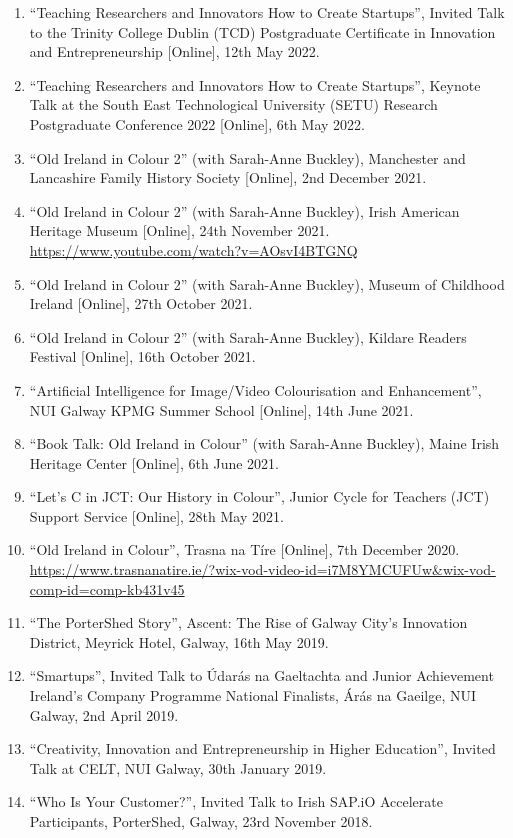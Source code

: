 \documentclass[10pt,a4paper]{res} %
\begin{document}
\begin{resume}
\begin{enumerate}
\item ``Teaching Researchers and Innovators How to Create Startups'', Invited Talk to the Trinity College Dublin (TCD) Postgraduate Certificate in Innovation and Entrepreneurship [Online], 12th May 2022.
\item ``Teaching Researchers and Innovators How to Create Startups'', Keynote Talk at the South East Technological University (SETU) Research Postgraduate Conference 2022 [Online], 6th May 2022.
\item ``Old Ireland in Colour 2'' (with Sarah-Anne Buckley), Manchester and Lancashire Family History Society [Online], 2nd December 2021.
\item ``Old Ireland in Colour 2'' (with Sarah-Anne Buckley), Irish American Heritage Museum [Online], 24th November 2021. \url{https://www.youtube.com/watch?v=AOsvI4BTGNQ}
\item ``Old Ireland in Colour 2'' (with Sarah-Anne Buckley), Museum of Childhood Ireland [Online], 27th October 2021.
\item ``Old Ireland in Colour 2'' (with Sarah-Anne Buckley), Kildare Readers Festival [Online], 16th October 2021.
\item ``Artificial Intelligence for Image/Video Colourisation and Enhancement'', NUI Galway KPMG Summer School [Online], 14th June 2021.
\item ``Book Talk: Old Ireland in Colour'' (with Sarah-Anne Buckley), Maine Irish Heritage Center [Online], 6th June 2021.
\item ``Let's C in JCT: Our History in Colour'', Junior Cycle for Teachers (JCT) Support Service [Online], 28th May 2021.
\item ``Old Ireland in Colour'', Trasna na T\'{i}re [Online], 7th December 2020. \url{https://www.trasnanatire.ie/?wix-vod-video-id=i7M8YMCUFUw&wix-vod-comp-id=comp-kb431v45}
\item ``The PorterShed Story'', Ascent: The Rise of Galway City's Innovation District, Meyrick Hotel, Galway, 16th May 2019.
\item ``Smartups'', Invited Talk to \'{U}dar\'{a}s na Gaeltachta and Junior Achievement Ireland's Company Programme National Finalists, \'{A}r\'{a}s na Gaeilge, NUI Galway, 2nd April 2019.
\item ``Creativity, Innovation and Entrepreneurship in Higher Education'', Invited Talk at CELT, NUI Galway, 30th January 2019.
\item ``Who Is Your Customer?'', Invited Talk to Irish SAP.iO Accelerate Participants, PorterShed, Galway, 23rd November 2018.

\end{enumerate}
\end{resume}
\end{document}
